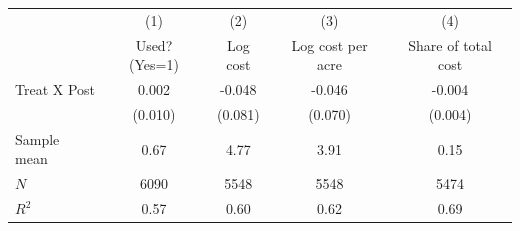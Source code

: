 {
\def\sym#1{\ifmmode^{#1}\else\(^{#1}\)\fi}
\begin{tabular}{l*{4}{c}}
\hline\hline
                    &\multicolumn{1}{c}{(1)}&\multicolumn{1}{c}{(2)}&\multicolumn{1}{c}{(3)}&\multicolumn{1}{c}{(4)}\\
                    &\multicolumn{1}{c}{Used? (Yes=1)}&\multicolumn{1}{c}{Log cost}&\multicolumn{1}{c}{Log cost per acre}&\multicolumn{1}{c}{Share of total cost}\\
\hline
Treat X Post        &       0.002         &      -0.048         &      -0.046         &      -0.004         \\
                    &     (0.010)         &     (0.081)         &     (0.070)         &     (0.004)         \\
\hline
Sample mean         &        0.67         &        4.77         &        3.91         &        0.15         \\
$N$                 &        6090         &        5548         &        5548         &        5474         \\
$R^2$               &        0.57         &        0.60         &        0.62         &        0.69         \\
\hline\hline
\end{tabular}
}
